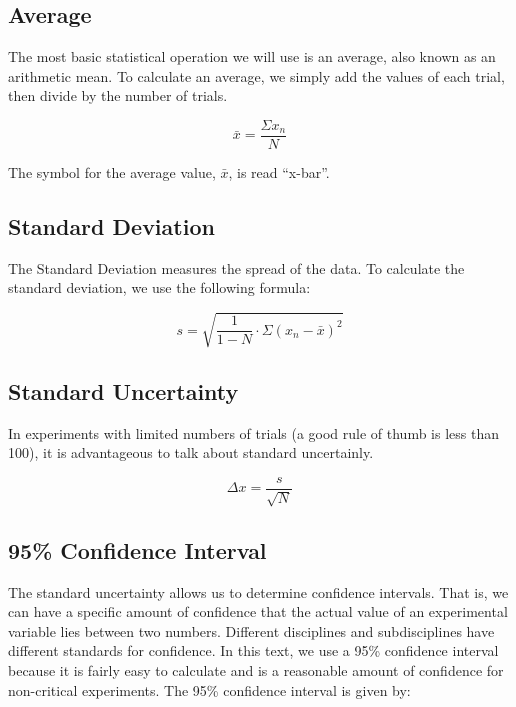 	\subsection{Average} 
The most basic statistical operation we will use is an \gls{average}, also known as an arithmetic mean.  To calculate an average, we simply add the values of each trial, then divide by the number of trials.
	
\begin{mdframed}[backgroundcolor=orange!20!white]	   	
	\begin{equation}
		\bar{x} = \frac{\Sigma x_n}{N}
		\label{equation:average}
	\end{equation}
\end{mdframed}
The symbol for the average value, $\bar{x}$, is read ``x-bar''.

	\subsection{Standard Deviation} 

The Standard Deviation measures the spread of the data.  To calculate the standard deviation, we use the following formula:

\begin{mdframed}[backgroundcolor=orange!20!white]
	\begin{equation}
		s = \sqrt{\frac{1}{1-N} \cdot \Sigma (x_n - \bar{x})^2}
		\label{equation:stdev}
	\end{equation}
\end{mdframed}
	
	\subsection{Standard Uncertainty} 
	In experiments with limited numbers of trials (a good rule of thumb is less than 100), it is advantageous to talk about standard uncertainly.  
	\begin{mdframed}[backgroundcolor=orange!20!white]
		\begin{equation}
			\Delta x = \frac{s}{\sqrt{N}}
			\label{equation:stduncertainty}
		\end{equation}
	\end{mdframed}
	
	
	
	\subsection{95\% Confidence Interval} 
	The standard uncertainty allows us to determine confidence intervals.  That is, we can have a specific amount of confidence that the actual value of an experimental variable lies between two numbers.  Different disciplines and subdisciplines have different standards for confidence.  In this text, we use a 95\% confidence interval because it is fairly easy to calculate and is a reasonable amount of confidence for non-critical experiments.  The 95\% confidence interval is given by:
	
